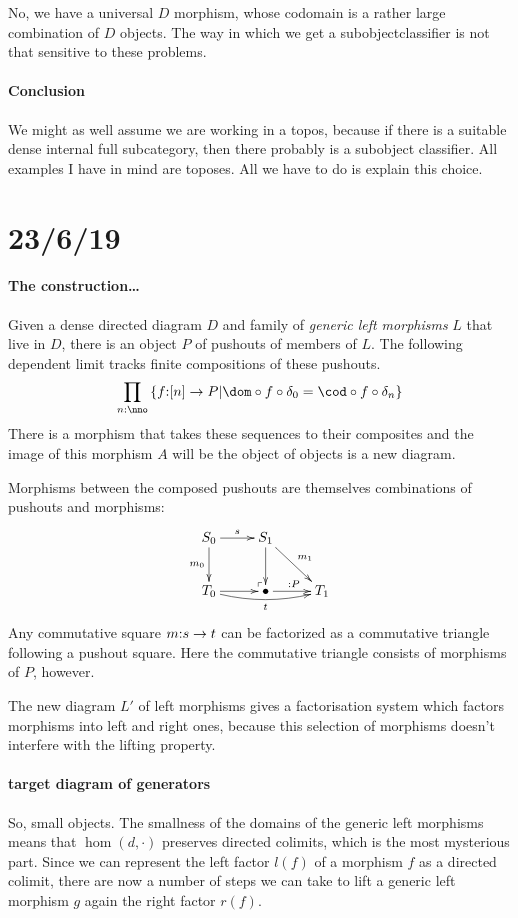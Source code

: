 \documentclass[csh.tex]{subfiles}
\makeatletter
\newcommand\pushout{\ar@{}[dr]|(.9)\ulcorner}
\makeatother
\begin{document}
No, we have a universal $D$ morphism, whose codomain is a rather large 
combination of $D$ objects. The way in which we get a subobjectclassifier is
not that sensitive to these problems.

\paragraph{Conclusion}
We might as well assume we are working in a topos, because if there is a
suitable dense internal full subcategory, then there probably is a subobject
classifier. All examples I have in mind are toposes. All we have to do is
explain this choice.

\section{23/6/19}
\paragraph{The construction\dots}
Given a dense directed diagram $D$ and family of \emph{generic left morphisms}
$L$ that live in $D$, there is an object $P$ of pushouts of members of $L$. 
The following dependent limit tracks finite compositions of these pushouts.
\[\prod_{n\of\nno}\set{f\of[n]\to P|\dom\circ f\circ\delta_0 = \cod\circ f \circ \delta_n}\]
There is a morphism that takes these sequences to their composites and the
image of this morphism $A$ will be the object of objects is a new diagram.

Morphisms between the composed pushouts are themselves combinations of pushouts
and morphisms:
\[\xymatrix{
  S_0 \ar[r]^s\ar[d]_{m_0}\pushout & S_1\ar[d]\ar[dr]^{m_1}\\
  T_0 \ar@/_/[rr]_t\ar[r] & \bullet \ar[r]^{\of P} & T_1
}\]
Any commutative square $m\mathord : s\to t$ can be factorized as a commutative 
triangle following a pushout square. Here the commutative triangle consists of
morphisms of $P$, however.

The new diagram $L'$ of left morphisms gives a factorisation system which 
factors morphisms into left and right ones, because this selection of morphisms 
doesn't interfere with the lifting property.

\paragraph{target diagram of generators}
So, small objects. The smallness of the domains of the generic left morphisms
means that $\hom(d,\cdot)$ preserves directed colimits, which is the most
mysterious part. Since we can represent the left factor $l(f)$ of a morphism 
$f$ as a directed colimit, there are now a number of steps we can take to lift 
a generic left morphism $g$ again the right factor  $r(f)$.
\end{document}

